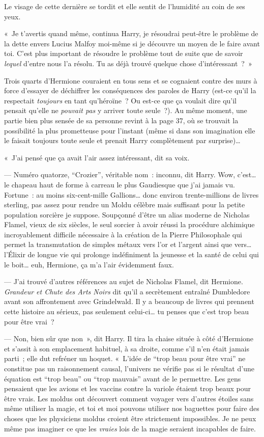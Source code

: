 Le visage de cette dernière se tordit et elle sentit de l'humidité au coin de ses yeux.

«~Je t'avertis quand même, continua Harry, je résoudrai peut-être le problème de la dette envers Lucius Malfoy moi-même si je découvre un moyen de le faire avant toi. C'est plus important de résoudre le problème tout de suite que de savoir \emph{lequel} d'entre nous l'a résolu. Tu as déjà trouvé quelque chose d'intéressant~?~»

Trois quarts d'Hermione couraient en tous sens et se cognaient contre des murs à force d'essayer de déchiffrer les conséquences des paroles de Harry (est-ce qu'il la respectait \emph{toujours} en tant qu'héroïne~? Ou est-ce que ça voulait dire qu'il pensait qu'elle ne \emph{pouvait pas} y arriver toute seule~?). Au même moment, une partie bien plus sensée de sa personne revint à la page 37, où se trouvait la possibilité la plus prometteuse pour l'instant (même si dans son imagination elle le faisait toujours toute seule et prenait Harry complètement par surprise)…

«~J'ai pensé que ça avait l'air assez intéressant, dit sa voix.

--- Numéro quatorze, “Crozier”, véritable nom~: inconnu, dit Harry. Wow, c'est… le chapeau haut de forme à carreau le plus Gaudiesque que j'ai jamais vu. Fortune~: au moins six-cent-mille Gallions… donc environ trente-millions de livres sterling, pas assez pour rendre un Moldu célèbre mais suffisant pour la petite population sorcière je suppose. Soupçonné d'être un alias moderne de Nicholas Flamel, vieux de six siècles, le seul sorcier à avoir réussi la procédure alchimique incroyablement difficile nécessaire à la création de la Pierre Philosophale qui permet la transmutation de simples métaux vers l'or et l'argent ainsi que vers… l'Élixir de longue vie qui prolonge indéfiniment la jeunesse et la santé de celui qui le boit… euh, Hermione, ça m'a l'air évidemment faux.

--- J'ai trouvé d'autres références au sujet de Nicholas Flamel, dit Hermione. \emph{Grandeur et Chute des Arts Noirs} dit qu'il a secrètement entraîné Dumbledore avant son affrontement avec Grindelwald. Il y a beaucoup de livres qui prennent cette histoire au sérieux, pas seulement celui-ci… tu penses que c'est trop beau pour être vrai~?

--- Non, bien sûr que non~», dit Harry. Il tira la chaise située à côté d'Hermione et s'assit à son emplacement habituel, à sa droite, comme s'il n'en était jamais parti~; elle dut refréner un hoquet. «~L'idée de “trop beau pour être vrai” ne constitue pas un raisonnement causal, l'univers ne vérifie pas si le résultat d'une équation est “trop beau” ou “trop mauvais” avant de le permettre. Les gens pensaient que les avions et les vaccins contre la variole étaient trop beaux pour être vrais. Les moldus ont découvert comment voyager vers d'autres étoiles sans même utiliser la magie, et toi et moi pouvons utiliser nos baguettes pour faire des choses que les physiciens moldus croient être strictement impossibles. Je ne peux même pas imaginer ce que les \emph{vraies} lois de la magie seraient incapables de faire.

